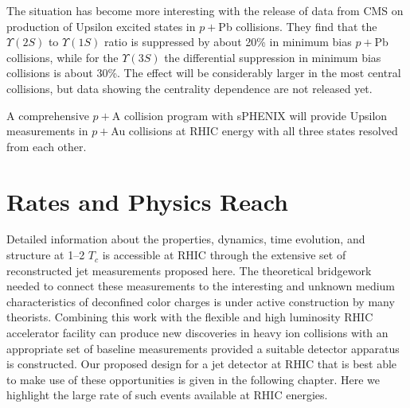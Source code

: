 The situation has become more interesting with the release of data from CMS on production of 
Upsilon excited states in $p+$Pb collisions. They find that the $\Upsilon(2S)$ to $\Upsilon(1S)$ ratio
is suppressed by about 20\% in minimum bias $p+$Pb collisions, while for the $\Upsilon(3S)$ the differential
suppression in minimum bias  collisions is about 30\%. The effect will be considerably 
larger in the most central collisions, but data showing the 
centrality dependence are not released yet.

A comprehensive $p+$A collision program with sPHENIX will provide Upsilon measurements in $p+$Au
collisions at RHIC energy with all three states resolved from each other. 



\section{Rates and Physics Reach}
\label{sec:physicscasesummary}

Detailed information about the \qgp properties,
dynamics, time evolution, and structure at 1--2 $T_{c}$ is accessible 
at RHIC through the extensive set of reconstructed jet measurements
proposed here. The theoretical bridgework needed to connect these
measurements to the interesting and unknown medium characteristics 
of deconfined color charges is under active construction by many 
theorists. Combining this work with the flexible and high luminosity
RHIC accelerator facility can produce new discoveries in heavy ion 
collisions with an appropriate set of baseline measurements 
provided a suitable detector apparatus is constructed. Our proposed
design for a jet detector at RHIC that is best able to make use of these
opportunities is given in the following chapter.
Here we highlight the large rate of such events available at RHIC energies.

